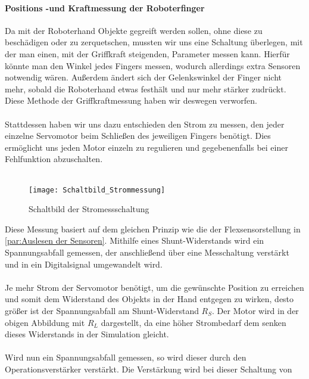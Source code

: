 \documentclass[titlepage,12pt,twoside]{article}
\begin{document}
\paragraph{Positions -und Kraftmessung der Roboterfinger}
\label{par:Positions -und Kraftmessung der Roboterfinger}
\hfill \break
\hfill \break
Da mit der Roboterhand Objekte gegreift werden sollen, ohne diese zu beschädigen oder zu zerquetschen, mussten wir uns eine Schaltung überlegen,
mit der man einen, mit der Griffkraft steigenden, Parameter messen kann. Hierfür könnte man den Winkel jedes Fingers messen, wodurch
allerdings extra Sensoren notwendig wären. Außerdem ändert sich der Gelenkswinkel der Finger nicht mehr, sobald die Roboterhand
etwas festhält und nur mehr stärker zudrückt. Diese Methode der Griffkraftmessung haben wir deswegen verworfen. \\
\\
Stattdessen haben wir uns dazu entschieden den Strom zu messen, den jeder einzelne Servomotor beim Schließen des jeweiligen Fingers
benötigt. Dies ermöglicht uns jeden Motor einzeln zu regulieren und gegebenenfalls bei einer Fehlfunktion abzuschalten. \\
\\
\begin{figure}[H]
	\begin{center}
		\scalebox{1.2}
		{\texttt{[image: Schaltbild\_Strommessung]}}
		\caption{Schaltbild der Stromessschaltung}
		\label{fig:Schaltbild_Strommessung}		
	\end{center}
\end{figure}
\hfill \break
Diese Messung basiert auf dem gleichen Prinzip wie die der Flexsensorstellung in \autoref{par:Auslesen der Sensoren}. Mithilfe eines 
Shunt-Widerstands wird ein Spannungsabfall gemessen, der anschließend über eine Messchaltung verstärkt und in ein Digitalsignal
umgewandelt wird. \\
\\
Je mehr Strom der Servomotor benötigt, um die gewünschte Position zu erreichen und somit dem Widerstand des Objekts in der Hand entgegen
zu wirken, desto größer ist der Spannungsabfall am Shunt-Widerstand $R_{S}$. Der Motor wird in der obigen Abbildung mit $R_{L}$ dargestellt,
da eine höher Strombedarf dem senken dieses Widerstands in der Simulation gleicht. \\
\\
Wird nun ein Spannungsabfall gemessen, so wird dieser durch den Operationsverstärker verstärkt. Die Verstärkung wird bei dieser Schaltung von 
\end{document}
